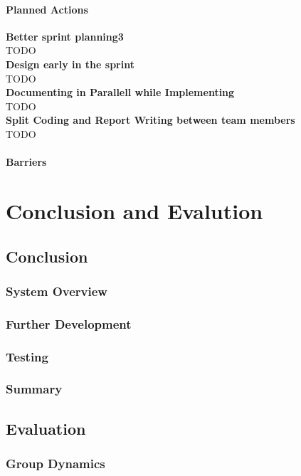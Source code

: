 \documentclass{report}
\begin{document}
\subsection{Planned Actions} \label{subsec:planned_act3}
\textbf{Better sprint planning3}\\
TODO\\
\textbf{Design early in the sprint}\\
TODO\\
\textbf{Documenting in Parallell while Implementing}\\
TODO\\
\textbf{Split Coding and Report Writing between team members}\\
TODO
\subsection{Barriers} \label{subsec:barriers3}



\part{Conclusion and Evalution}

\chapter{Conclusion} \label{cha:conclusion}
\section{System Overview} \label{sec:system_overview}
\section{Further Development} \label{sec:further_dev}
\section{Testing} \label{sec:testing}
\section{Summary} \label{sec:summary_conc}

\chapter{Evaluation} \label{cha:evaluation}
\section{Group Dynamics} \label{sec:group_dynamics}
\end{document}
